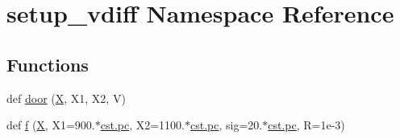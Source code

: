 \hypertarget{namespacesetup__vdiff}{}\section{setup\+\_\+vdiff Namespace Reference}
\label{namespacesetup__vdiff}
\subsection*{Functions}
\begin{DoxyCompactItemize}
\item 
def \hyperlink{namespacesetup__vdiff_a3514bc0bda9acf16aa13843a1d9d6918}{door} (\hyperlink{namespacesetup__vdiff_a2d0381db5d912bb072d7cfa7c997de97}{X}, X1, X2, V)
\item 
def \hyperlink{namespacesetup__vdiff_a5329b0899ca891d3f000cc80bdf7b214}{f} (\hyperlink{namespacesetup__vdiff_a2d0381db5d912bb072d7cfa7c997de97}{X}, X1=900.$\ast$\hyperlink{constants_8h_a2884cd030c4c825754349a525a1d06ce}{cst.\+pc}, X2=1100.$\ast$\hyperlink{constants_8h_a2884cd030c4c825754349a525a1d06ce}{cst.\+pc}, sig=20.$\ast$\hyperlink{constants_8h_a2884cd030c4c825754349a525a1d06ce}{cst.\+pc}, R=1e-\/3)
\end{DoxyCompactItemize}
